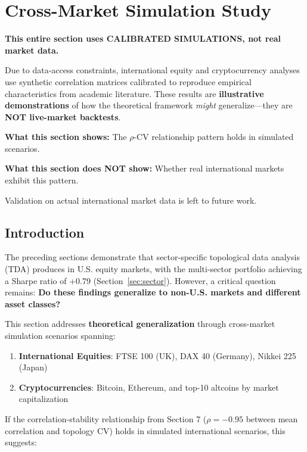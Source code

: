 \section{Cross-Market Simulation Study}
\label{sec:crossmarket}

\begin{tcolorbox}[colback=red!5, colframe=red!70, title=\textbf{IMPORTANT: Simulation Disclaimer}]
\textbf{This entire section uses CALIBRATED SIMULATIONS, not real market data.}

Due to data-access constraints, international equity and cryptocurrency analyses use synthetic correlation matrices calibrated to reproduce empirical characteristics from academic literature. These results are \textbf{illustrative demonstrations} of how the theoretical framework \textit{might} generalize---they are \textbf{NOT live-market backtests}.

\textbf{What this section shows:} The $\rho$-CV relationship pattern holds in simulated scenarios.

\textbf{What this section does NOT show:} Whether real international markets exhibit this pattern.

Validation on actual international market data is left to future work.
\end{tcolorbox}

\subsection{Introduction}

The preceding sections demonstrate that sector-specific topological data analysis (TDA) produces \positiverisk{} in U.S. equity markets, with the multi-sector portfolio achieving a Sharpe ratio of +0.79 (Section~\ref{sec:sector}). However, a critical question remains: \textbf{Do these findings generalize to non-U.S. markets and different asset classes?}

This section addresses \textbf{theoretical generalization} through cross-market simulation scenarios spanning:

\begin{enumerate}
\item \textbf{International Equities}: FTSE 100 (UK), DAX 40 (Germany), Nikkei 225 (Japan)
\item \textbf{Cryptocurrencies}: Bitcoin, Ethereum, and top-10 altcoins by market capitalization
\end{enumerate}

If the correlation-stability relationship from Section 7 ($\rho = -0.95$ between mean correlation and topology CV) holds in simulated international scenarios, this suggests:

